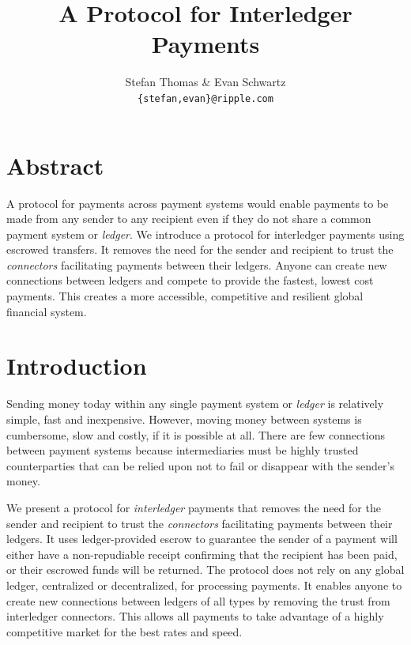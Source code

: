 \documentclass[letterpaper,twocolumn,10pt]{article}
\begin{document}
\date{}

\title{\Large \bf A Protocol for Interledger Payments}

\author{
\textnormal{Stefan Thomas \& Evan Schwartz} \\
\textnormal{\texttt{\{stefan,evan\}@ripple.com}}
}

\maketitle

\thispagestyle{empty}

\section*{Abstract}

A protocol for payments across payment systems would enable payments to be made from any sender to any recipient even if they do not share a common payment system or \textit{ledger}. We introduce a protocol for interledger payments using escrowed transfers. It removes the need for the sender and recipient to trust the \textit{connectors} facilitating payments between their ledgers. Anyone can create new connections between ledgers and compete to provide the fastest, lowest cost payments. This creates a more accessible, competitive and resilient global financial system.

\section{Introduction}


Sending money today within any single payment system or \textit{ledger} is relatively simple, fast and inexpensive. However, moving money between systems is cumbersome, slow and costly, if it is possible at all. There are few connections between payment systems because intermediaries must be highly trusted counterparties that can be relied upon not to fail or disappear with the sender's money.

We present a protocol for \mbox{\textit{interledger}} payments that removes the need for the sender and recipient to trust the \textit{connectors} facilitating payments between their ledgers. It uses ledger-provided escrow to guarantee the sender of a payment will either have a non-repudiable receipt confirming that the recipient has been paid, or their escrowed funds will be returned. The protocol does not rely on any global ledger, centralized or decentralized, for processing payments. It enables anyone to create new connections between ledgers of all types by removing the trust from interledger connectors. This allows all payments to take advantage of a highly competitive market for the best rates and speed.
\end{document}
